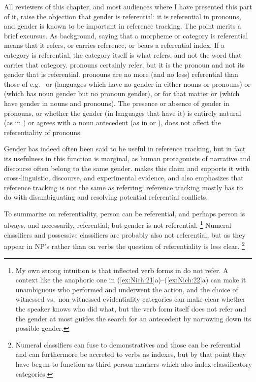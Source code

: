 \documentclass[output=collectionpaper]{langsci/langscibook}
\begin{document}
All reviewers of this chapter, and most audiences where I have presented this part of it, raise the objection that gender is referential: it is referential in  pronouns, and gender is known to be important in reference tracking. The point merits a brief excursus. As background, saying that a morpheme or category is referential means that it refers, or carries reference, or bears a referential index. If a category is referential, the category itself is what refers, and not the word that carries that category.  pronouns certainly refer, but it is the pronoun and not its gender that is referential.  pronouns are no more (and no less) referential than those of e.g.\  or  (languages which have no gender in either nouns or pronouns) or  (which has noun gender but no pronoun gender), or for that matter  or  (which have gender in nouns and pronouns). The presence or absence of gender in pronouns, or whether the gender (in languages that have it) is entirely natural (as in ) or agrees with a noun antecedent (as in  or ), does not affect the referentiality of pronouns.

Gender has indeed often been said to be useful in reference tracking, but in fact its usefulness in this function is marginal, as human protagonists of narrative and discourse often belong to the same gender. \citet[334--360]{Kibrik2011} makes this claim and supports it with cross-linguistic, discourse, and experimental evidence, and also emphasizes that reference tracking is not the same as referring: reference tracking mostly has to do with disambiguating and resolving potential referential conflicts.

To summarize on referentiality, person can be referential, and perhaps person is always, and necessarily, referential; but gender is not referential.%
\footnote{%
My own strong intuition is that inflected verb forms in  do not refer. A context like the anaphoric one in (\ref{ex:Nich:21}a)--(\ref{ex:Nich:22}a) can make it unambiguous who performed and underwent the action, and the choice of witnessed vs.\ non-witnessed evidentiality categories can make clear whether the speaker knows who did what, but the verb form itself does not refer and the gender at most guides the search for an antecedent by narrowing down its possible gender.
} %
Numeral classifiers and possessive classifiers are probably also not referential, but as they appear in NP's rather than on verbs the question of referentiality is less clear.%
\footnote{%
Numeral classifiers can fuse to demonstratives and those can be referential and can furthermore be accreted to verbs as indexes, but by that point they have begun to function as third person markers which also index classificatory categories.
}%
\end{document}
